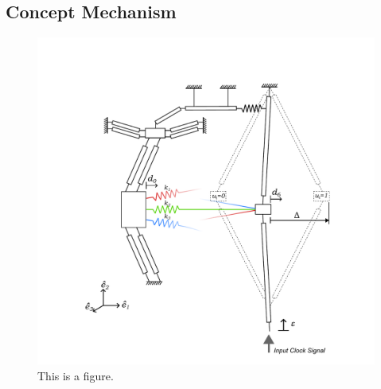 \subsection*{Concept Mechanism}
\begin{figure}[h]
    \centering
    \includegraphics[width=\textwidth]{images/SVGs/PRBM.pdf}
    \caption{This is a figure.}
    \label{fig:Mechanism}
\end{figure}

